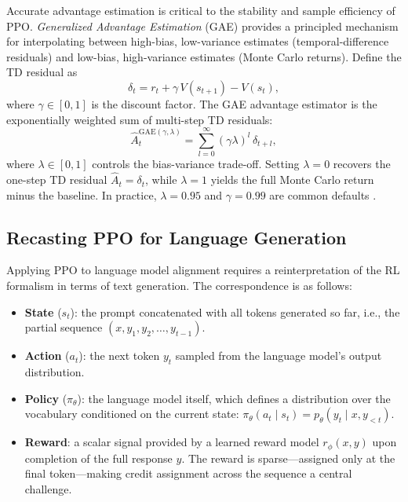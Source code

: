 Accurate advantage estimation is critical to the stability and sample efficiency of PPO. \emph{Generalized Advantage Estimation} (GAE) provides a principled mechanism for interpolating between high-bias, low-variance estimates (temporal-difference residuals) and low-bias, high-variance estimates (Monte Carlo returns). Define the TD residual as
\begin{equation}
    \delta_t = r_t + \gamma \, V(s_{t+1}) - V(s_t),
\end{equation}
where $\gamma \in [0,1]$ is the discount factor. The GAE advantage estimator is the exponentially weighted sum of multi-step TD residuals:
\begin{equation}
    \label{eq:gae}
    \hat{A}_t^{\text{GAE}(\gamma, \lambda)} = \sum_{l=0}^{\infty} (\gamma \lambda)^l \, \delta_{t+l},
\end{equation}
where $\lambda \in [0,1]$ controls the bias-variance trade-off. Setting $\lambda = 0$ recovers the one-step TD residual $\hat{A}_t = \delta_t$, while $\lambda = 1$ yields the full Monte Carlo return minus the baseline. In practice, $\lambda = 0.95$ and $\gamma = 0.99$ are common defaults \cite{schulman2017ppo}.

\subsection{Recasting PPO for Language Generation}

Applying PPO to language model alignment requires a reinterpretation of the RL formalism in terms of text generation. The correspondence is as follows:
\begin{itemize}
    \item \textbf{State} ($s_t$): the prompt concatenated with all tokens generated so far, i.e., the partial sequence $(x, y_1, y_2, \ldots, y_{t-1})$.
    \item \textbf{Action} ($a_t$): the next token $y_t$ sampled from the language model's output distribution.
    \item \textbf{Policy} ($\pi_\theta$): the language model itself, which defines a distribution over the vocabulary conditioned on the current state: $\pi_\theta(a_t \mid s_t) = p_\theta(y_t \mid x, y_{<t})$.
    \item \textbf{Reward}: a scalar signal provided by a learned reward model $r_\phi(x, y)$ upon completion of the full response $y$. The reward is sparse---assigned only at the final token---making credit assignment across the sequence a central challenge.
\end{itemize}

